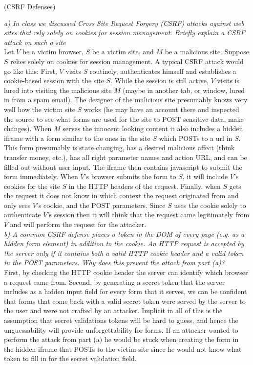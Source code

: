 \begin{prob}  (CSRF Defenses) 
\end{prob}

\noindent \textit{a) In class we discussed Cross Site Request Forgery (CSRF) attacks against web sites that rely solely on cookies for session management. Briefly explain a CSRF attack on such a site}\\

Let $V$ be a victim browser, $S$ be a victim site, and $M$ be a malicious site. Suppose $S$ relies solely on cookies for session management. A typical CSRF attack would go like this: First, $V$ visits $S$ routinely, authenticates himself and establishes a cookie-based session with the site $S$. While the session is still active, $V$ visits is lured into visiting the malicious site $M$ (maybe in another tab, or window, lured in from a spam email). The designer of the malicious site presumably knows very well how the victim site $S$ works (he may have an account there and inspected the source to see what forms are used for the site to POST sensitive data, make changes). When $M$ serves the innocent looking content it also includes a hidden iframe with a form similar to the ones in the site $S$ which POSTs to a url in $S$. This form presumably is state changing, has a desired malicious affect (think transfer money, etc.), has all right parameter names and action URL, and can be filled out without user input. The iframe then contains javascript to submit the form immediately. When $V$'s browser submits the form to $S$, it will include $V$'s cookies for the site $S$ in the HTTP headers of the request. Finally, when $S$ gets the request it does not know in which context the request originated from and only sees $V$'s cookie, and the POST parameters. Since $S$ uses the cookie solely to authenticate $V$'s session then it will think that the request came legitimately from $V$ and will perform the request for the attacker.  \\

\noindent \textit{b) A common CSRF defense places a token in the DOM of every page (e.g. as a hidden form element) in addition to the cookie. An HTTP request is accepted by the server only if it contains both a valid HTTP cookie header and a valid token in the POST parameters. Why does this prevent the attack from part (a)?}\\

First, by checking the HTTP cookie header the server can identify which browser a request came from. Second, by generating a secret token that the server includes as a hidden input field for every form that it serves, we can be confident that forms that come back with a valid secret token were served by the server to the user and were not crafted by an attacker. Implicit in all of this is the assumption that secret validations tokens will be hard to guess, and hence the unguessability will provide unforgettability for forms. If an attacker wanted to perform the attack from part (a) he would be stuck when creating the form in the hidden iframe that POSTs to the victim site since he would not know what token to fill in for the secret validation field. \\

